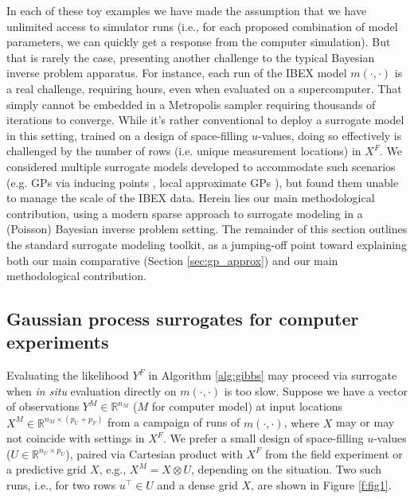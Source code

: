 \documentclass[11pt]{article}
\begin{document}
In each of these toy examples we have made the assumption that we have unlimited
access to simulator runs (i.e., for each proposed combination of model
parameters, we can quickly get a response from the computer simulation). But
that is rarely the case, presenting another challenge to the typical Bayesian
inverse problem apparatus. For instance, each run of the IBEX model $m(\cdot,
\cdot)$ is a real challenge, requiring hours, even when evaluated on a
supercomputer.  That simply cannot be embedded in a Metropolis sampler
requiring thousands of iterations to converge.  While it's rather conventional
to deploy a surrogate model \citep[e.g.][]{gramacy2020surrogates} in this
setting, trained on a design of space-filling $u$-values, doing so effectively
is challenged by the number of rows (i.e. unique measurement locations) in
$X^F$.  We considered multiple surrogate models developed to accommodate such
scenarios (e.g. GPs via inducing points \citep{banerjee2008gaussian}, local
approximate GPs \citep{gramacy2014lagp}), but found them unable to manage the
scale of the IBEX data. Herein lies our main methodological contribution, using
a modern sparse approach to surrogate modeling in a (Poisson) Bayesian inverse
problem setting. The remainder of this section outlines the standard surrogate
modeling toolkit, as a jumping-off point toward explaining both our main
comparative (Section \ref{sec:gp_approx}) and our main methodological
contribution.

\subsection{Gaussian process surrogates for computer experiments}
\label{sec:gp_surr}

Evaluating the likelihood $Y^F$ in Algorithm \ref{alg:gibbs} may proceed via
surrogate when {\em in situ} evaluation directly on $m(\cdot, \cdot)$ is too
slow. Suppose we have a vector of observations {\color{red} $Y^M \in
\mathbb{R}^{n_M}$ } ($M$ for computer model) at input locations
{\color{red}$X^M \in \mathbb{R}^{n_M \times (p_U+p_F)}$} from a campaign of
runs of $m(\cdot, \cdot)$, {\color{red}where $X$} may or may not coincide with
settings in $X^F$. We prefer a small design of space-filling $u$-values {\color{red}($U
\in \mathbb{R}^{n_U \times p_U}$)}, paired via Cartesian product with $X^F$ from
the field experiment or a predictive grid $X$, e.g., $X^M = X \otimes U$,
depending on the situation. Two such runs, i.e., for two rows $u^\top \in U$
and a dense grid $X$, are shown in Figure \ref{f:fig1}.
\end{document}
